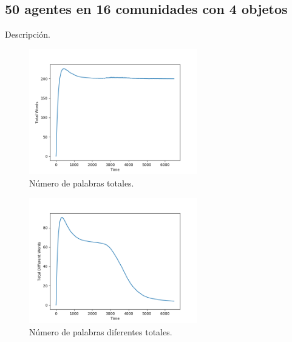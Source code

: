 \documentclass[runningheads]{llncs}
\begin{document}
\subsection{50 agentes en 16 comunidades con 4 objetos}
Descripción.
\begin{figure}[h]
	\centering
	\includegraphics[width=0.65\textwidth]{Figure_113_TotalWords.png}
	\caption{Número de palabras totales.}
	\label{fig_002}
\end{figure}
\begin{figure}[h]
	\centering
	\includegraphics[width=0.65\textwidth]{Figure_113_TotalDifferentWords.png}
	\caption{Número de palabras diferentes totales.}
	\label{fig_003}
\end{figure}
\pagebreak
\\
\end{document}
